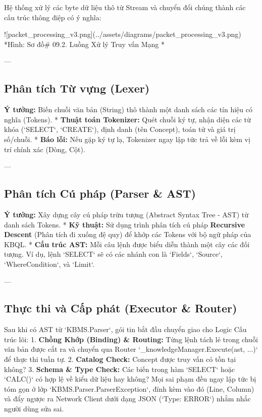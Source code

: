 Hệ thống xử lý các byte dữ liệu thô từ Stream và chuyển đổi chúng thành các cấu trúc thông điệp có ý nghĩa:

![packet\_processing\_v3.png](../assets/diagrams/packet\_processing\_v3.png)
*Hình: Sơ đồ\# 09.2. Luồng Xử lý Truy vấn Mạng
*

---

\subsection{Phân tích Từ vựng (Lexer)}

\textbf{Ý tưởng:} Biến chuỗi văn bản (String) thô thành một danh sách các tín hiệu có nghĩa (Tokens).
*   \textbf{Thuật toán Tokenizer:} Quét chuỗi ký tự, nhận diện các từ khóa (`SELECT`, `CREATE`), định danh (tên Concept), toán tử và giá trị số/chuỗi.
*   \textbf{Báo lỗi:} Nếu gặp ký tự lạ, Tokenizer ngay lập tức trả về lỗi kèm vị trí chính xác (Dòng, Cột).

---

\subsection{Phân tích Cú pháp (Parser & AST)}

\textbf{Ý tưởng:} Xây dựng cây cú pháp trừu tượng (Abstract Syntax Tree - AST) từ danh sách Tokens.
*   \textbf{Kỹ thuật:} Sử dụng trình phân tích cú pháp \textbf{Recursive Descent} (Phân tích đi xuống đệ quy) để khớp các Tokens với bộ ngữ pháp của KBQL.
*   \textbf{Cấu trúc AST:} Mỗi câu lệnh được biểu diễn thành một cây các đối tượng. Ví dụ, lệnh `SELECT` sẽ có các nhánh con là `Fields`, `Source`, `WhereCondition`, và `Limit`.

---

\subsection{Thực thi và Cấp phát (Executor & Router)}

Sau khi có AST từ `KBMS.Parser`, gói tin bắt đầu chuyển giao cho Logic Cấu trúc lõi:
1.  \textbf{Chồng Khớp (Binding) \& Routing:} Từng lệnh tách lẻ trong chuỗi văn bản được cắt ra và chuyển qua Router `\_knowledgeManager.Execute(ast, ...)` để thực thi tuần tự.
2.  \textbf{Catalog Check:} Concept được truy vấn có tồn tại không?
3.  \textbf{Schema \& Type Check:} Các biến trong hàm `SELECT` hoặc `CALC()` có hợp lệ về kiểu dữ liệu hay không? Mọi sai phạm đều ngay lập tức bị tóm gọn ở lớp `KBMS.Parser.ParserException`, đính kèm vào đó (Line, Column) và đẩy ngược ra Network Client dưới dạng JSON (`Type: ERROR`) nhằm nhắc người dùng sửa sai.

